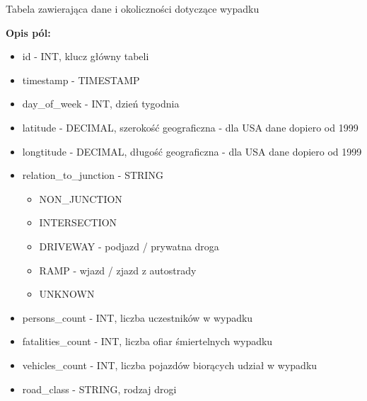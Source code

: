 Tabela zawierająca dane i okoliczności dotyczące wypadku

\textbf{Opis pól:}

\begin{itemize}
\item
  id - INT, klucz główny tabeli\\
\item
  timestamp - TIMESTAMP\\
\item
  day\_of\_week - INT, dzień tygodnia\\
\item
  latitude - DECIMAL, szerokość geograficzna - dla USA dane dopiero od
  1999\\
\item
  longtitude - DECIMAL, długość geograficzna - dla USA dane dopiero od
  1999\\
\item
  relation\_to\_junction - STRING

  \begin{itemize}
  \itemsep1pt\parskip0pt
  \item
    NON\_JUNCTION\\
  \item
    INTERSECTION\\
  \item
    DRIVEWAY - podjazd / prywatna droga\\
  \item
    RAMP - wjazd / zjazd z autostrady\\
  \item
    UNKNOWN\\
  \end{itemize}
\item
  persons\_count - INT, liczba uczestników w wypadku\\
\item
  fatalities\_count - INT, liczba ofiar śmiertelnych wypadku\\
\item
  vehicles\_count - INT, liczba pojazdów biorących udział w wypadku\\
\item
  road\_class - STRING, rodzaj drogi


\end{itemize}

